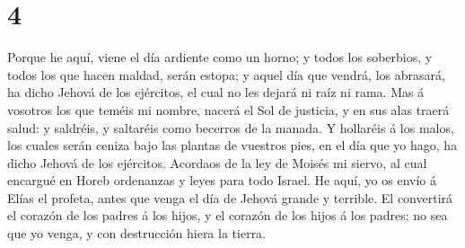 \hypertarget{section-3}{%
\section{4}\label{section-3}}

 Porque he aquí, viene el día ardiente como un horno; y
todos los soberbios, y todos los que hacen maldad, serán estopa; y aquel
día que vendrá, los abrasará, ha dicho Jehová de los ejércitos, el cual
no les dejará ni raíz ni rama.  Mas á vosotros los que
teméis mi nombre, nacerá el Sol de justicia, y en sus alas traerá salud:
y saldréis, y saltaréis como becerros de la manada.  Y
hollaréis á los malos, los cuales serán ceniza bajo las plantas de
vuestros pies, en el día que yo hago, ha dicho Jehová de los ejércitos.
 Acordaos de la ley de Moisés mi siervo, al cual encargué en
Horeb ordenanzas y leyes para todo Israel.  He aquí, yo os
envío á Elías el profeta, antes que venga el día de Jehová grande y
terrible.  El convertirá el corazón de los padres á los
hijos, y el corazón de los hijos á los padres: no sea que yo venga, y
con destrucción hiera la tierra.
